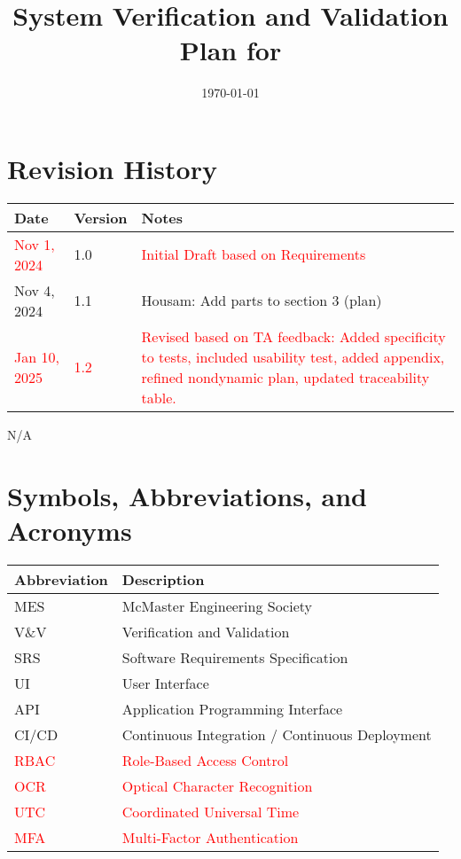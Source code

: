 \documentclass[12pt, titlepage]{article}
\begin{document}
\title{System Verification and Validation Plan for \progname{}}
\author{\authname}
\date{\today}

\maketitle


\section*{Revision History}

\begin{tabularx}{\textwidth}{p{3cm}p{2cm}X}
\toprule {\bf Date} & {\bf Version} & {\bf Notes}\\
\midrule
\textcolor{red}{Nov 1, 2024} & 1.0 & \textcolor{red}{Initial Draft based on Requirements}\\ %
Nov 4, 2024 & 1.1 & Housam: Add parts to section 3 (plan)\\
\textcolor{red}{Jan 10, 2025} & \textcolor{red}{1.2} & \textcolor{red}{Revised based on TA feedback: Added specificity to tests, included usability test, added appendix, refined nondynamic plan, updated traceability table.} \\ %
\bottomrule
\end{tabularx}

\newpage

\tableofcontents

\listoftables

\listoffigures
N/A

\newpage

\section{Symbols, Abbreviations, and Acronyms}

\renewcommand{\arraystretch}{1.2}
\begin{tabular}{|p{3cm}|p{10cm}|}
    \hline
    \textbf{Abbreviation} & \textbf{Description} \\
    \hline
    MES & McMaster Engineering Society \\
    \hline
    V\&V & Verification and Validation \\
    \hline
    SRS & Software Requirements Specification \\
    \hline
    UI & User Interface \\
    \hline
    API & Application Programming Interface \\
    \hline
    CI/CD & Continuous Integration / Continuous Deployment \\
    \hline
    \textcolor{red}{RBAC} & \textcolor{red}{Role-Based Access Control} \\
    \hline
    \textcolor{red}{OCR} & \textcolor{red}{Optical Character Recognition} \\
    \hline
    \textcolor{red}{UTC} & \textcolor{red}{Coordinated Universal Time} \\
    \hline
    \textcolor{red}{MFA} & \textcolor{red}{Multi-Factor Authentication} \\
    \hline
\end{tabular}
\end{document}
